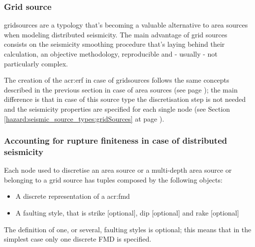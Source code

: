 \subsubsection{Grid source}
\Glspl{gridsource} are a typology that's becoming a valuable alternative
to area sources when modeling distributed seismicity. 
%
The main advantage of grid sources consists on the seismicity smoothing 
procedure that's laying behind their calculation, an objective methodology,
reproducible and - usually - not particularly complex. 

The creation of the \gls{acr:erf} in case of \glspl{gridsource} follows 
the same concepts described in the previous section in case of area 
sources (see page \pageref{sec:areasource}); the main difference is that 
in case of this source type the discretisation step is not needed and 
the seismicity properties are specified for each single node (see Section
\ref{hazard:seismic_source_types:gridSources} at page 
\pageref{hazard:seismic_source_types:gridSources}).
%
\subsubsection{Accounting for rupture finiteness in case of distributed 
seismicity}
%
Each node used to discretise an area source or a multi-depth area 
source or belonging to a grid source has tuples composed by 
the following objects:
\begin{itemize}
\item A discrete representation of a \gls{acr:fmd} 
\item A faulting style, that is strike [optional], dip [optional] and 
rake [optional] 
\end{itemize}
The definition of one, or several, faulting styles is optional; this 
means that in the simplest case only one discrete FMD is specified.

